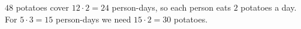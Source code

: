 $48$ potatoes cover $12\cdot2=24$ person-days, so each person eats $2$ potatoes a day. For $5\cdot3=15$ person-days we need $15\cdot2=\boxed{30}$ potatoes.
